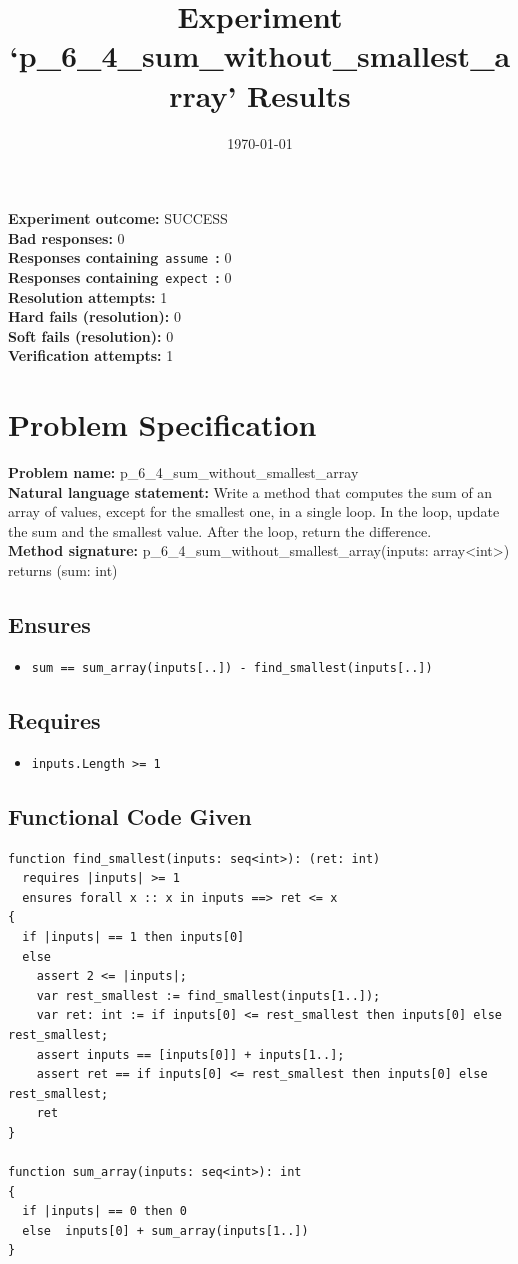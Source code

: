 \documentclass{article}
\begin{document}
\title{Experiment `p\_6\_4\_sum\_without\_smallest\_array' Results}
\author{\today}
\date{}
\maketitle
\textbf{Experiment outcome: }SUCCESS
\\\textbf{Bad responses: }0
\\\textbf{Responses containing}~\texttt{assume}~\textbf{: }0
\\\textbf{Responses containing}~\texttt{expect}~\textbf{: }0
\\\textbf{Resolution attempts: }1
\\\textbf{Hard fails (resolution): }0
\\\textbf{Soft fails (resolution): }0
\\\textbf{Verification attempts: }1
\section*{Problem Specification}
\textbf{Problem name: }p\_6\_4\_sum\_without\_smallest\_array
\\\textbf{Natural language statement: }Write a method that computes the sum of an array of values, except for the smallest one, in a single loop. In the loop, update the sum and the smallest value. After the loop, return the difference.
\\\textbf{Method signature: }p\_6\_4\_sum\_without\_smallest\_array(inputs: array<int>) returns (sum: int)
\subsection*{Ensures}
\begin{itemize}
\item \texttt{sum == sum\_array(inputs[..]) - find\_smallest(inputs[..])}
\end{itemize}
\subsection*{Requires}
\begin{itemize}
\item \texttt{inputs.Length >= 1}
\end{itemize}
\subsection*{Functional Code Given}
\begin{lstlisting}
function find_smallest(inputs: seq<int>): (ret: int)
  requires |inputs| >= 1
  ensures forall x :: x in inputs ==> ret <= x 
{
  if |inputs| == 1 then inputs[0]
  else 
    assert 2 <= |inputs|;
    var rest_smallest := find_smallest(inputs[1..]);
    var ret: int := if inputs[0] <= rest_smallest then inputs[0] else rest_smallest;
    assert inputs == [inputs[0]] + inputs[1..]; 
    assert ret == if inputs[0] <= rest_smallest then inputs[0] else rest_smallest;
    ret 
}

function sum_array(inputs: seq<int>): int
{
  if |inputs| == 0 then 0
  else  inputs[0] + sum_array(inputs[1..])
}
\end{lstlisting}
\clearpage
\end{document}
